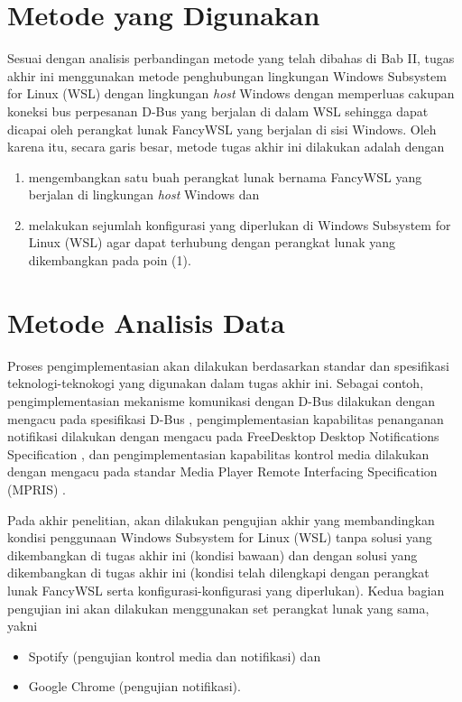 \section{Metode yang Digunakan}

Sesuai dengan analisis perbandingan metode yang telah dibahas di Bab II, tugas akhir ini menggunakan metode penghubungan lingkungan Windows Subsystem for Linux (WSL) dengan lingkungan \textit{host} Windows dengan memperluas cakupan koneksi bus perpesanan D-Bus yang berjalan di dalam WSL sehingga dapat dicapai oleh perangkat lunak FancyWSL yang berjalan di sisi Windows. Oleh karena itu, secara garis besar, metode tugas akhir ini dilakukan adalah dengan
\begin{enumerate}
    \item mengembangkan satu buah perangkat lunak bernama FancyWSL yang berjalan di lingkungan \textit{host} Windows dan
    \item melakukan sejumlah konfigurasi yang diperlukan di Windows Subsystem for Linux (WSL) agar dapat terhubung dengan perangkat lunak yang dikembangkan pada poin (1).
\end{enumerate}

\section{Metode Analisis Data}

Proses pengimplementasian akan dilakukan berdasarkan standar dan spesifikasi teknologi-teknokogi yang digunakan dalam tugas akhir ini. Sebagai contoh, pengimplementasian mekanisme komunikasi dengan D-Bus dilakukan dengan mengacu pada spesifikasi D-Bus \cite{dbus-specification}, pengimplementasian kapabilitas penanganan notifikasi dilakukan dengan mengacu pada FreeDesktop Desktop Notifications Specification \cite{xdg-desktop-notifications-specification}, dan pengimplementasian kapabilitas kontrol media dilakukan dengan mengacu pada standar Media Player Remote Interfacing Specification (MPRIS) \cite{xdg-mpris-specification}.

Pada akhir penelitian, akan dilakukan pengujian akhir yang membandingkan kondisi penggunaan Windows Subsystem for Linux (WSL) tanpa solusi yang dikembangkan di tugas akhir ini (kondisi bawaan) dan dengan solusi yang dikembangkan di tugas akhir ini (kondisi telah dilengkapi dengan perangkat lunak FancyWSL serta konfigurasi-konfigurasi yang diperlukan). Kedua bagian pengujian ini akan dilakukan menggunakan set perangkat lunak yang sama, yakni
\begin{itemize}
    \item Spotify (pengujian kontrol media dan notifikasi) dan
    \item Google Chrome (pengujian notifikasi).
\end{itemize}
